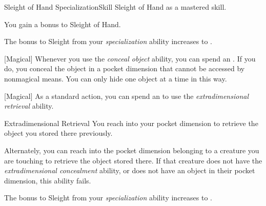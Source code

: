     \begin{feat}{Sleight of Hand Specialization}{Skill}
        \featpre Sleight of Hand as a mastered skill.

        \ff{}

         You gain a  bonus to Sleight of Hand.

         The bonus to Sleight from your \textit{specialization} ability increases to .

        [Magical] Whenever you use the \textit{conceal object} ability, you can spend an .
        If you do, you conceal the object in a pocket dimension that cannot be accessed by nonmagical means.
        You can only hide one object at a time in this way.

        [Magical] As a standard action, you can spend an  to use the \textit{extradimensional retrieval} ability.
        \begin{ability}{Extradimensional Retrieval}
            You reach into your pocket dimension to retrieve the object you stored there previously.

            Alternately, you can reach into the pocket dimension belonging to a creature you are touching to retrieve the object stored there.
            If that creature does not have the \textit{extradimensional concealment} ability, or does not have an object in their pocket dimension, this ability fails.
        \end{ability}

         The bonus to Sleight from your \textit{specialization} ability increases to .
    \end{feat}


